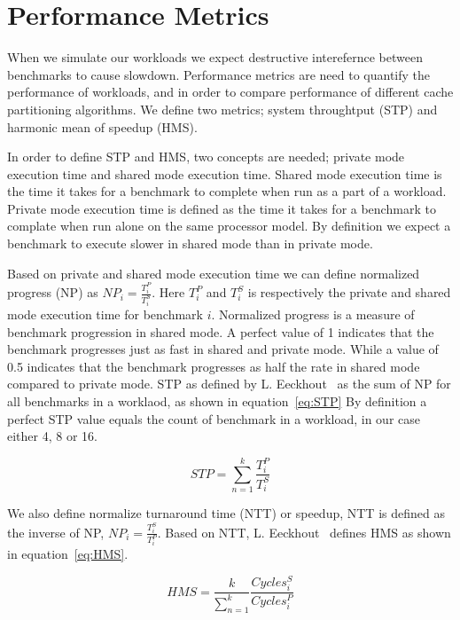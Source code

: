 \section{Performance Metrics}
\label{sec:methodology:metrics}

When we simulate our workloads we expect destructive interefernce between benchmarks to cause slowdown.
Performance metrics are need to quantify the performance of workloads, and in order to compare performance of different cache partitioning algorithms.
We define two metrics; system throughtput (STP) and harmonic mean of speedup (HMS).

In order to define STP and HMS, two concepts are needed; private mode execution time and shared mode execution time.
Shared mode execution time is the time it takes for a benchmark to complete when run as a part of a workload.
Private mode execution time is defined as the time it takes for a benchmark to complate when run alone on the same processor model.
By definition we expect a benchmark to execute slower in shared mode than in private mode.

Based on private and shared mode execution time we can define normalized progress (NP) as $NP_i = \frac{T^{P}_i}{T^{S}_i}$.
Here $T^{P}_i$ and $T^{S}_i$ is respectively the private and shared mode execution time for benchmark $i$.
Normalized progress is a measure of benchmark progression in shared mode.
A perfect value of 1 indicates that the benchmark progresses just as fast in shared and private mode.
While a value of 0.5 indicates that the benchmark progresses as half the rate in shared mode compared to private mode.
STP as defined by L. Eeckhout~\cite{Eeckhout2010} as the sum of NP for all benchmarks in a worklaod, as shown in equation~\ref{eq:STP}
By definition a perfect STP value equals the count of benchmark in a workload, in our case either 4, 8 or 16.

\begin{equation} \label{eq:STP} 
 STP = {\sum\limits_{n=1}^{k}}\frac{T^{P}_i}{T^{S}_i}
\end{equation}

We also define normalize turnaround time (NTT) or speedup, NTT is defined as the inverse of NP, $NP_i = \frac{T^{S}_i}{T^{P}_i}$.
Based on NTT, L. Eeckhout~\cite{Eeckhout2010} defines HMS as shown in equation~\ref{eq:HMS}.

\begin{equation} \label{eq:HMS}
 HMS = \frac{k}{\sum\limits_{n=1}^{k}}\frac{Cycles^{S}_i}{Cycles^{P}_i}
\end{equation}

